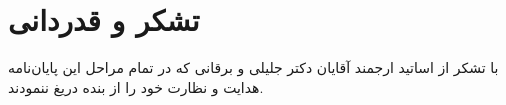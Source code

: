 \chapter*{تشکر و قدردانی}
\large
با تشکر از اساتيد ارجمند آقايان دکتر جلیلی و برقانی که در تمام مراحل اين پايان‌نامه هدايت و نظارت خود را از بنده دريغ ننمودند.
\normalsize

\clearpage